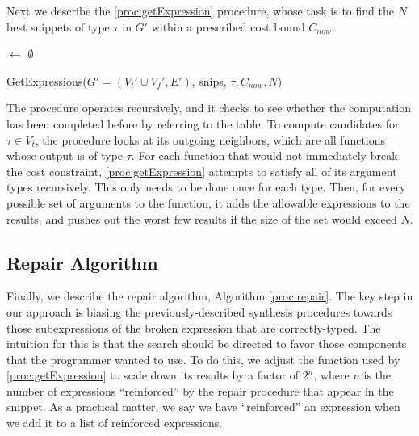 Next we describe the \ref{proc:getExpression} procedure, whose task is
to find the $N$ best snippets of type $\tau$ in $G'$ within a
prescribed cost bound $C_{now}$.
\begin{procedure}[htb]
\lIf{$\tau$ $\in$ \Keys{\Snips}}{\Return{\Snips$[\tau]$}}
\Results $\leftarrow$ $\emptyset$ \;
\Return{\Results}
\caption{GetExpressions({$G'=(V_t' \cup V_f', E')$}, snips, $\tau, C_{now}, N$)}\label{proc:getExpression}
\end{procedure}
The procedure operates recursively, and it checks to see whether the
computation has been completed before by referring to the \Snips
table. To compute candidates for $\tau \in V_t$, the procedure looks
at its outgoing neighbors, which are all functions whose output is of type $\tau$.
For each function that would not immediately break the cost constraint,
\ref{proc:getExpression} attempts to satisfy all of its argument types recursively.
This only needs to be done once for each type. Then, for every possible
set of arguments to the function, it adds the allowable expressions to the
results, and pushes out the worst few results if the size of the set would
exceed $N$.

\subsection{Repair Algorithm}
\label{sec:algorithm:repair}
Finally, we describe the repair algorithm, Algorithm \ref{proc:repair}. The key step in our
approach is biasing the previously-described synthesis procedures
towards those subexpressions of the broken expression that are
correctly-typed. The intuition for this is that the search should be
directed to favor those components that the programmer wanted to use.
To do this, we adjust the \Cost function used by \ref{proc:getExpression} to 
scale down its results by a factor of $2^n$, where $n$ is the number of
expressions ``reinforced'' by the repair procedure that appear in the
snippet. As a practical matter, we say we have ``reinforced'' an
expression when we add it to a list of reinforced expressions.

